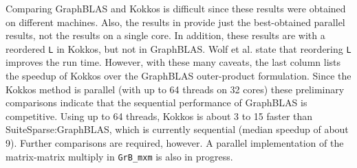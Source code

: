 \documentclass[12pt]{article}
\begin{document}
Comparing GraphBLAS and Kokkos is difficult since these results were obtained
on different machines.  Also, the results in
\cite{WolfDeveciBerryHammondRajamanickam17} provide just the best-obtained
parallel results, not the results on a single core.  In addition, these results
are with a reordered \verb'L' in Kokkos, but not in GraphBLAS.  Wolf et al.
\cite{WolfDeveciBerryHammondRajamanickam17} state that reordering \verb'L'
improves the run time.  However, with these many caveats, the last column lists
the speedup of Kokkos over the GraphBLAS outer-product formulation.  Since the
Kokkos method is parallel (with up to 64 threads on 32 cores) these preliminary
comparisons indicate that the sequential performance of GraphBLAS is
competitive.  Using up to 64 threads, Kokkos is about 3 to 15 faster than
SuiteSparse:GraphBLAS, which is currently sequential (median speedup of about
9).  Further comparisons are required, however.  A parallel implementation of
the matrix-matrix multiply in \verb'GrB_mxm' is also in progress.


\vspace{0.5in}
\end{document}
